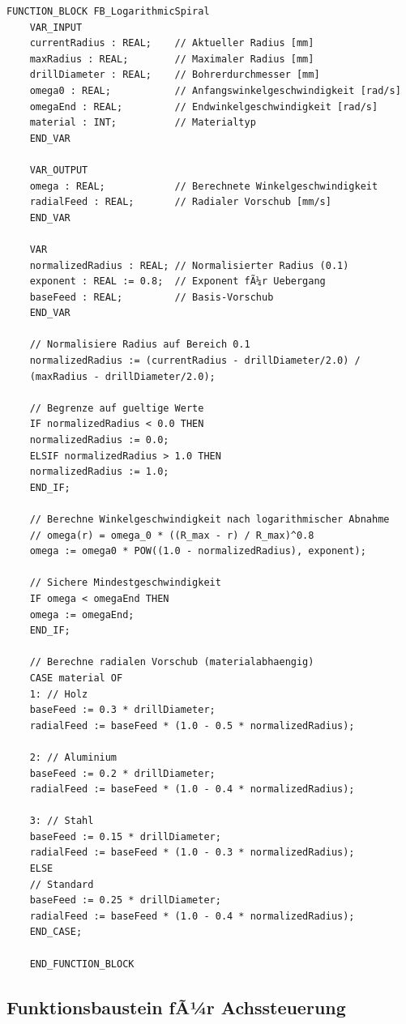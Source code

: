 ﻿\documentclass[12pt,a4paper]{article}
\begin{document}
\begin{lstlisting}[style=structuredtext, caption={Funktionsbaustein fÃ¼r logarithmische Spiralparameter}, label={lst:spiral}]
	FUNCTION_BLOCK FB_LogarithmicSpiral
	VAR_INPUT
	currentRadius : REAL;    // Aktueller Radius [mm]
	maxRadius : REAL;        // Maximaler Radius [mm]
	drillDiameter : REAL;    // Bohrerdurchmesser [mm]
	omega0 : REAL;           // Anfangswinkelgeschwindigkeit [rad/s]
	omegaEnd : REAL;         // Endwinkelgeschwindigkeit [rad/s]
	material : INT;          // Materialtyp
	END_VAR
	
	VAR_OUTPUT
	omega : REAL;            // Berechnete Winkelgeschwindigkeit
	radialFeed : REAL;       // Radialer Vorschub [mm/s]
	END_VAR
	
	VAR
	normalizedRadius : REAL; // Normalisierter Radius (0.1)
	exponent : REAL := 0.8;  // Exponent fÃ¼r Uebergang
	baseFeed : REAL;         // Basis-Vorschub
	END_VAR
	
	// Normalisiere Radius auf Bereich 0.1
	normalizedRadius := (currentRadius - drillDiameter/2.0) / 
	(maxRadius - drillDiameter/2.0);
	
	// Begrenze auf gueltige Werte
	IF normalizedRadius < 0.0 THEN
	normalizedRadius := 0.0;
	ELSIF normalizedRadius > 1.0 THEN
	normalizedRadius := 1.0;
	END_IF;
	
	// Berechne Winkelgeschwindigkeit nach logarithmischer Abnahme
	// omega(r) = omega_0 * ((R_max - r) / R_max)^0.8
	omega := omega0 * POW((1.0 - normalizedRadius), exponent);
	
	// Sichere Mindestgeschwindigkeit
	IF omega < omegaEnd THEN
	omega := omegaEnd;
	END_IF;
	
	// Berechne radialen Vorschub (materialabhaengig)
	CASE material OF
	1: // Holz
	baseFeed := 0.3 * drillDiameter;
	radialFeed := baseFeed * (1.0 - 0.5 * normalizedRadius);
	
	2: // Aluminium
	baseFeed := 0.2 * drillDiameter;
	radialFeed := baseFeed * (1.0 - 0.4 * normalizedRadius);
	
	3: // Stahl
	baseFeed := 0.15 * drillDiameter;
	radialFeed := baseFeed * (1.0 - 0.3 * normalizedRadius);
	ELSE
	// Standard
	baseFeed := 0.25 * drillDiameter;
	radialFeed := baseFeed * (1.0 - 0.4 * normalizedRadius);
	END_CASE;
	
	END_FUNCTION_BLOCK
\end{lstlisting}

\subsection{Funktionsbaustein fÃ¼r Achssteuerung}
\end{document}
